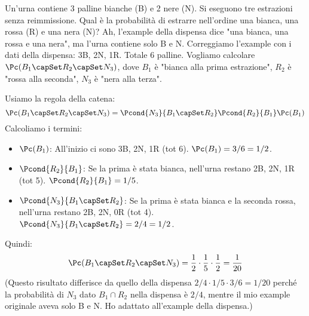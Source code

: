 \begin{example}
Un'urna contiene 3 palline bianche (B) e 2 nere (N). Si eseguono tre estrazioni senza reimmissione.
Qual è la probabilità di estrarre nell'ordine una bianca, una rossa (R) e una nera (N)? Ah, l'example della dispensa dice "una bianca, una rossa e una nera", ma l'urna contiene solo B e N. Correggiamo l'example con i dati della dispensa: 3B, 2N, 1R. Totale 6 palline.
Vogliamo calcolare $\Pc(B_1 \capSet R_2 \capSet N_3)$, dove $B_1$ è "bianca alla prima estrazione", $R_2$ è "rossa alla seconda", $N_3$ è "nera alla terza".

Usiamo la regola della catena:
\[ \Pc(B_1 \capSet R_2 \capSet N_3) = \Pcond{N_3}{B_1 \capSet R_2} \Pcond{R_2}{B_1} \Pc(B_1) \]
Calcoliamo i termini:
\begin{itemize}
    \item $\Pc(B_1)$: All'inizio ci sono 3B, 2N, 1R (tot 6). $\Pc(B_1) = 3/6 = 1/2$.
    \item $\Pcond{R_2}{B_1}$: Se la prima è stata bianca, nell'urna restano 2B, 2N, 1R (tot 5). $\Pcond{R_2}{B_1} = 1/5$.
    \item $\Pcond{N_3}{B_1 \capSet R_2}$: Se la prima è stata bianca e la seconda rossa, nell'urna restano 2B, 2N, 0R (tot 4). $\Pcond{N_3}{B_1 \capSet R_2} = 2/4 = 1/2$.
\end{itemize}
Quindi:
\[ \Pc(B_1 \capSet R_2 \capSet N_3) = \frac{1}{2} \cdot \frac{1}{5} \cdot \frac{1}{2} = \frac{1}{20} \]
(Questo risultato differisce da quello della dispensa $2/4 \cdot 1/5 \cdot 3/6 = 1/20$ perché la probabilità di $N_3$ dato $B_1 \cap R_2$ nella dispensa è $2/4$, mentre il mio example originale aveva solo B e N. Ho adattato all'example della dispensa.)
\end{example}

